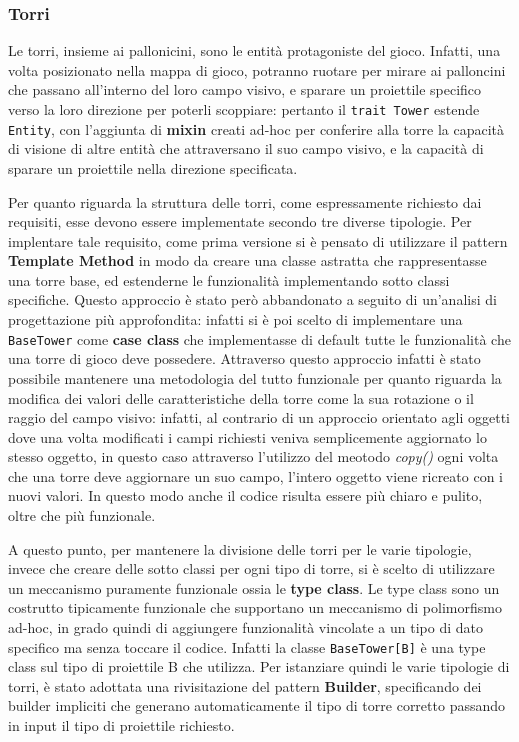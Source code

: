 

\subsubsection{Torri}
Le torri, insieme ai pallonicini, sono le entità protagoniste del gioco. Infatti, una volta posizionato nella mappa
di gioco, potranno ruotare per mirare ai palloncini che passano all'interno del loro campo visivo, e sparare un
proiettile specifico verso la loro direzione per poterli scoppiare: pertanto il \texttt{trait Tower} estende
\texttt{Entity}, con l'aggiunta di \textbf{mixin} creati ad-hoc per conferire alla torre la capacità di visione di altre
entità che attraversano il suo campo visivo, e la capacità di sparare un proiettile nella direzione specificata.

Per quanto riguarda la struttura delle torri, come espressamente richiesto dai requisiti, esse devono essere
implementate secondo tre diverse tipologie. Per implentare tale requisito, come prima versione si è pensato di
utilizzare il pattern \textbf{Template Method} in modo da creare una classe astratta che rappresentasse una torre
base, ed estenderne le funzionalità implementando sotto classi specifiche. Questo approccio è stato però abbandonato
a seguito di un'analisi di progettazione più approfondita: infatti si è poi scelto di implementare una
\texttt{BaseTower} come \textbf{case class} che implementasse di default tutte le funzionalità che una torre di gioco
deve possedere. Attraverso questo approccio infatti è stato possibile mantenere una metodologia del tutto funzionale
per quanto riguarda la modifica dei valori delle caratteristiche della torre come la sua rotazione o il raggio del
campo visivo: infatti, al contrario di un approccio orientato agli oggetti dove una volta modificati i campi
richiesti veniva semplicemente aggiornato lo stesso oggetto, in questo caso attraverso l'utilizzo del meotodo
\textit{copy()} ogni volta che una torre deve aggiornare un suo campo, l'intero oggetto viene ricreato con i nuovi
valori. In questo modo anche il codice risulta essere più chiaro e pulito, oltre che più funzionale.

A questo punto, per mantenere la divisione delle torri per le varie tipologie, invece che creare delle sotto classi
per ogni tipo di torre, si è scelto di utilizzare un meccanismo puramente funzionale ossia le \textbf{type class}. Le
type class sono un costrutto tipicamente funzionale che supportano un meccanismo di polimorfismo ad-hoc, in grado
quindi di aggiungere funzionalità vincolate a un tipo di dato specifico ma senza toccare il codice. Infatti la classe
\texttt{BaseTower[B]} è una type class sul tipo di proiettile B che utilizza. Per istanziare quindi le varie
tipologie di torri, è stato adottata una rivisitazione del pattern \textbf{Builder}, specificando dei builder
impliciti che generano automaticamente il tipo di torre corretto passando in input il tipo di proiettile richiesto.

